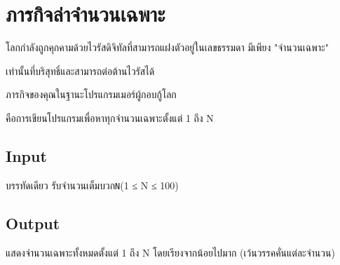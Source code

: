 \documentclass{article}
\begin{document}
\section*{ภารกิจล่าจำนวนเฉพาะ}

โลกกำลังถูกคุกคามด้วยไวรัสดิจิทัลที่สามารถแฝงตัวอยู่ในเลขธรรมดา มีเพียง "จำนวนเฉพาะ"

เท่านั้นที่บริสุทธิ์และสามารถต่อต้านไวรัสได้



ภารกิจของคุณในฐานะโปรแกรมเมอร์ผู้กอบกู้โลก

คือการเขียนโปรแกรมเพื่อหาทุกจำนวนเฉพาะตั้งแต่ 1 ถึง N



\subsection*{Input}
บรรทัดเดียว รับจำนวนเต็มบวก\texttt{N}(1 ≤ N ≤ 100)\\



\subsection*{Output}
แสดงจำนวนเฉพาะทั้งหมดตั้งแต่ 1 ถึง N โดยเรียงจากน้อยไปมาก (เว้นวรรคคั่นแต่ละจำนวน)
\end{document}
